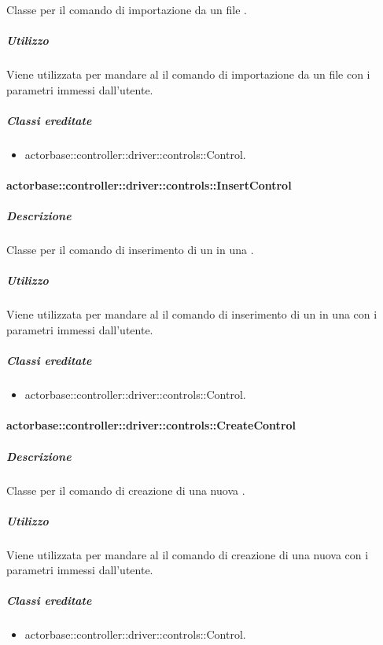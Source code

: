 \documentclass{scalatekids-article}
\begin{document}
Classe per il comando di importazione da un file .

\subparagraph{Utilizzo}

Viene utilizzata per mandare al  il comando di importazione da un file  con i parametri immessi dall'utente.

\subparagraph{Classi ereditate}

\begin{itemize}
\item actorbase::controller::driver::controls::Control.
\end{itemize}

\paragraph{actorbase::controller::driver::controls::InsertControl}

\subparagraph{Descrizione}

Classe per il comando di inserimento di un  in una .

\subparagraph{Utilizzo}

Viene utilizzata per mandare al  il comando di inserimento di un  in una  con i parametri immessi dall'utente.

\subparagraph{Classi ereditate}

\begin{itemize}
\item actorbase::controller::driver::controls::Control.
\end{itemize}

\paragraph{actorbase::controller::driver::controls::CreateControl}

\subparagraph{Descrizione}

Classe per il comando di creazione di una nuova .

\subparagraph{Utilizzo}

Viene utilizzata per mandare al  il comando di creazione di una nuova  con i parametri immessi dall'utente.

\subparagraph{Classi ereditate}

\begin{itemize}
\item actorbase::controller::driver::controls::Control.
\end{itemize}
\end{document}
